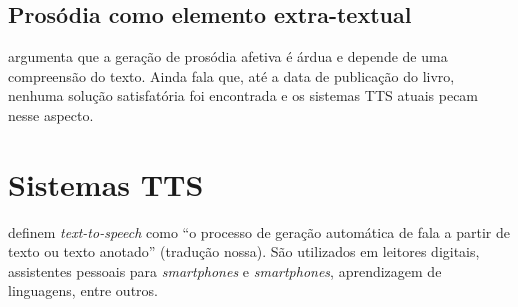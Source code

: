 \subsection{Prosódia como elemento extra-textual}
 argumenta que a geração de prosódia afetiva é árdua e
depende de uma compreensão do texto. Ainda fala que, até a data de publicação do
livro, nenhuma solução satisfatória foi encontrada e os sistemas TTS atuais
pecam nesse aspecto.


\section{Sistemas TTS}
 definem \emph{text-to-speech} como ``o processo de geração
automática de fala a partir de texto ou texto anotado'' (tradução nossa). São
utilizados em leitores digitais, assistentes pessoais para \emph{smartphones} e
\emph{smartphones}, aprendizagem de linguagens, entre outros.

